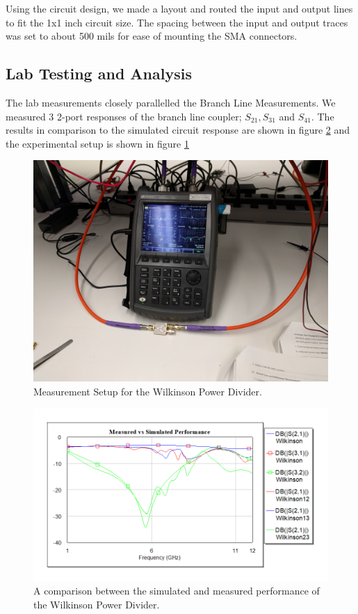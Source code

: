 \documentclass[twocolumn, aps, apl]{revtex4-1}
\begin{document}
Using the circuit design, we made a layout and routed the input and output lines to fit the 1x1 inch circuit size. The spacing between the input and output traces was set to about 500 mils for ease of mounting the SMA connectors.

\subsection{Lab Testing and Analysis}

The lab measurements closely parallelled the Branch Line Measurements. We measured 3 2-port responses of the branch line coupler; $S_{21}, S_{31}$ and $S_{41}$. The results in comparison to the simulated circuit response are shown in figure \ref{fig:wilkinsonmag} and the experimental setup is shown in figure \ref{fig:wilkinsonimg}


\begin{figure}[!htbp]
    \centering
    \includegraphics[scale=0.05]{WilkinsonImg.jpg}
    \caption{Measurement Setup for the Wilkinson Power Divider.}
    \label{fig:wilkinsonimg}
\end{figure}


\begin{figure}[!htbp]
    \centering
    \includegraphics[scale=0.4]{WilkinsonCircuit.png}
    \caption{A comparison between the simulated and measured performance of the Wilkinson Power Divider.}
    \label{fig:wilkinsonmag}
\end{figure}
\end{document}
